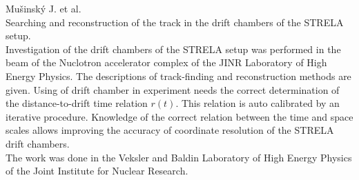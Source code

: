 
\thispagestyle{empty}

\noindent
Mu\v{s}insk\'{y} J. et al.\\
Searching and reconstruction of the track in the drift chambers of the
STRELA setup. \\

Investigation of the drift chambers of the STRELA setup was performed in the
beam of the Nuclotron accelerator complex of the JINR Laboratory of High Energy
Physics. The descriptions of track-finding and reconstruction methods are
given. Using of drift chamber in experiment needs the correct determination
of the distance-to-drift time relation $r(t)$. This relation is auto calibrated
by an iterative procedure. Knowledge of the correct relation between the time
and space scales allows improving the accuracy of coordinate resolution of the
STRELA drift chambers. \\

The work was done in the Veksler and Baldin Laboratory of High Energy Physics
of the Joint Institute for Nuclear Research.



